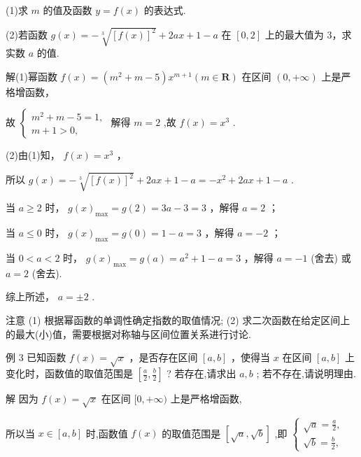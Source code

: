 \documentclass[10pt]{article}
\newcommand*\circled[1]{\tikz[baseline=(char.base)]{\node[shape=circle,draw,inner sep=1.5pt] (char) {\small #1};}}
\begin{document}
(1)求 \(m\) 的值及函数 \(y = f\left( x\right)\) 的表达式.

(2)若函数 \(g\left( x\right)  =  - \sqrt[3]{{\left\lbrack  f\left( x\right) \right\rbrack  }^{2}} + {2ax} + 1 - a\) 在 \(\left\lbrack  {0,2}\right\rbrack\) 上的最大值为 3，求实数 \(a\) 的值.

解(1)幂函数 \(f\left( x\right)  = \left( {{m}^{2} + m - 5}\right) {x}^{m + 1}\left( {m \in  \mathbf{R}}\right)\) 在区间 \(\left( {0, + \infty }\right)\) 上是严格增函数，

故 \(\left\{  \begin{array}{l} {m}^{2} + m - 5 = 1, \\  m + 1 > 0, \end{array}\right.\) 解得 \(m = 2\) ,故 \(f\left( x\right)  = {x}^{3}\) .

(2)由(1)知， \(f\left( x\right)  = {x}^{3}\) ，

所以 \(g\left( x\right)  =  - \sqrt[3]{{\left\lbrack  f\left( x\right) \right\rbrack  }^{2}} + {2ax} + 1 - a =  - {x}^{2} + {2ax} + 1 - a\) .

 \circled{1}  当 \(a \geq  2\) 时， \(g{\left( x\right) }_{\max } = g\left( 2\right)  = {3a} - 3 = 3\) ，解得 \(a = 2\) ；

 \circled{2}  当 \(a \leq  0\) 时， \(g{\left( x\right) }_{\max } = g\left( 0\right)  = 1 - a = 3\) ，解得 \(a =  - 2\) ；

 \circled{3}  当 \(0 < a < 2\) 时， \(g{\left( x\right) }_{\max } = g\left( a\right)  = {a}^{2} + 1 - a = 3\) ，解得 \(a =  - 1\) (舍去) 或 \(a = 2\) (舍去).

综上所述， \(a =  \pm  2\) .

注意 (1) 根据幂函数的单调性确定指数的取值情况; (2) 求二次函数在给定区间上的最大(小)值，需要根据对称轴与区间位置关系进行讨论.

例 3 已知函数 \(f\left( x\right)  = \sqrt{x}\) ，是否存在区间 \(\left\lbrack  {a,b}\right\rbrack\) ，使得当 \(x\) 在区间 \(\left\lbrack  {a,b}\right\rbrack\) 上变化时，函数值的取值范围是 \(\left\lbrack  {\frac{a}{2},\frac{b}{2}}\right\rbrack\) ? 若存在,请求出 \(a,b\) ; 若不存在,请说明理由.

解 因为 \(f\left( x\right)  = \sqrt{x}\) 在区间 \(\lbrack 0, + \infty )\) 上是严格增函数,

所以当 \(x \in  \left\lbrack  {a,b}\right\rbrack\) 时,函数值 \(f\left( x\right)\) 的取值范围是 \(\left\lbrack  {\sqrt{a},\sqrt{b}}\right\rbrack\) ,即 \(\left\{  \begin{array}{l} \sqrt{a} = \frac{a}{2}, \\  \sqrt{b} = \frac{b}{2}, \end{array}\right.\)
\end{document}
